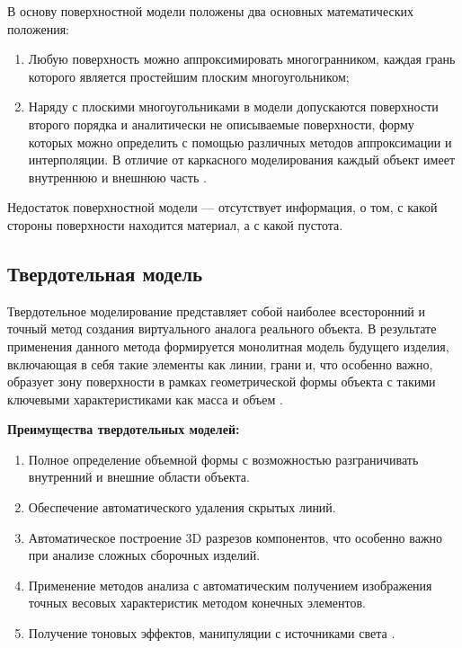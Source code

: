 В основу поверхностной модели положены два основных математических положения:
\begin{enumerate}

\item Любую поверхность можно аппроксимировать
многогранником, каждая грань которого является простейшим плоским
многоугольником;
\item Наряду с плоскими многоугольниками в модели допускаются поверхности второго порядка и аналитически не описываемые поверхности, форму которых можно определить с помощью различных методов аппроксимации и интерполяции. В отличие от каркасного моделирования каждый объект имеет внутреннюю и внешнюю часть \cite{model_geom_01}.
\end{enumerate}


Недостаток поверхностной модели --- отсутствует информация, о том, с какой стороны поверхности находится материал, а с какой пустота.

\subsection{Твердотельная модель}

Твердотельное моделирование представляет собой наиболее всесторонний и точный метод создания виртуального аналога реального объекта. В результате применения данного метода формируется монолитная модель будущего изделия, включающая в себя такие элементы как линии, грани и, что особенно важно, образует зону поверхности в рамках геометрической формы объекта с такими ключевыми характеристиками как масса и объем \cite{model_geom_01}.

\textbf{Преимущества твердотельных моделей:}

\begin{enumerate}
\item Полное определение объемной формы с возможностью разграничивать внутренний и внешние области объекта.
\item  Обеспечение автоматического удаления скрытых линий.
\item Автоматическое построение 3D разрезов компонентов, что особенно важно при анализе сложных сборочных изделий.
\item  Применение методов анализа с автоматическим получением изображения точных весовых характеристик методом конечных элементов.
\item Получение тоновых эффектов, манипуляции с источниками
света \cite{model_geom_01}.
\end{enumerate}


